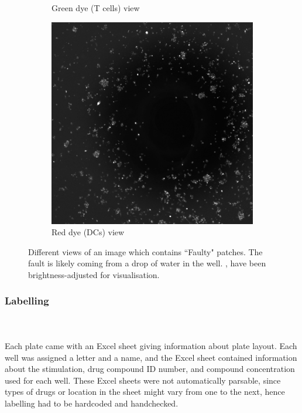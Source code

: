 \begin{figure}[h!]
\begin{subfigure}[h!]{0.3\textwidth}
        \caption{Green dye (T cells) view}
        \label{subfig:tcell}
    \end{subfigure}
    \begin{subfigure}[h!]{0.3\textwidth}
        \includegraphics[width=\textwidth]{dissertation/figures/faulty_dcell.jpg}
        \caption{Red dye (DCs) view}
        \label{subfig:dc}
    \end{subfigure}
    \caption{Different views of an image which contains ``Faulty" patches. The fault is likely coming from a drop of water in the well. \protect{}, \protect{} have been brightness-adjusted for visualisation.}
    \label{fig:noisyimage}
\end{figure}

\bigskip
\subsubsection{Labelling}

\hfill\\
\hfill\\
Each plate came with an Excel sheet giving information about plate layout. Each well was assigned a letter and a name, and the Excel sheet contained information about the stimulation, drug compound ID number, and compound concentration used for each well. These Excel sheets were not automatically parsable, since types of drugs or location in the sheet might vary from one to the next, hence labelling had to be hardcoded and handchecked. 

